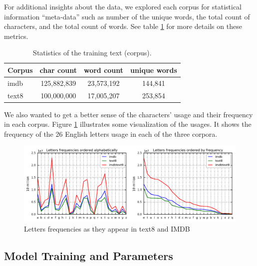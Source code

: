 \documentclass[11pt,letterpaper]{article}
\begin{document}
For additional insights about the data, we explored each corpus for
statistical information ``meta-data'' such as number of the unique
words, the total count of characters, and the total count of words. See
table \ref{tbl:corpora_stats} for more details on these metrics.

\begin{table}[ht]
\centering
\footnotesize

\begin{tabular}{@{}l||ccc@{}}
\toprule

Corpus & char count & word count & unique words \\\midrule

imdb & 125,882,839 & 23,573,192 & 144,841 \\
text8 & 100,000,000 & 17,005,207 & 253,854 \\

\bottomrule
\end{tabular}

\caption{Statistics of the training text (corpus).
\label{tbl:corpora_stats}}

\end{table}

We also wanted to get a better sense of the characters' usage and their
frequency in each corpus. Figure \ref{fig:cp-letter-freq} illustrates
some visualization of the usages. It shows the frequency of the 26
English letters usage in each of the three corpora.



\begin{figure}
\centering
\includegraphics{img/cp-letter-freq.png}
\caption{Letters frequencies as they appear in text8 and
IMDB\label{fig:cp-letter-freq}}
\end{figure}



\subsection{Model Training and
Parameters}\label{model-training-and-parameters}
\end{document}
